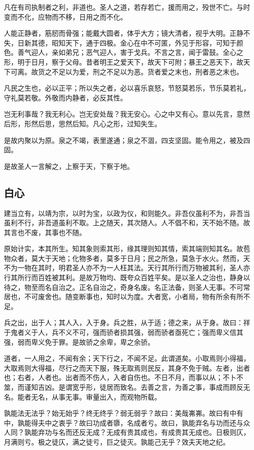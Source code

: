 凡在有司执制者之利，非道也。圣人之道，若存若亡，援而用之，殁世不亡。与时变而不化，应物而不移，日用之而不化。

人能正静者，筋肕而骨强；能戴大圆者，体乎大方；镜大清者，视乎大明。正静不失，日新其德，昭知天下，通于四极。金心在中不可匿，外见于形容，可知于颜色。善气迎人，亲如弟兄；恶气迎人，害于戈兵。不言之言，闻于雷鼓。全心之形，明于日月，察于父母。昔者明王之爱天下，故天下可附；暴王之恶天下，故天下可离。故货之不足以为爱，刑之不足以为恶。货者爱之末也，刑者恶之末也。

凡民之生也，必以正平；所以失之者，必以喜乐哀怒，节怒莫若乐，节乐莫若礼，守礼莫若敬。外敬而内静者，必反其性。

岂无利事哉？我无利心。岂无安处哉？我无安心。心之中又有心。意以先言，意然后形，形然后思，思然后知。凡心之形，过知失生。

是故内聚以为原。泉之不竭，表里遂通；泉之不涸，四支坚固。能令用之，被及四固。

是故圣人一言解之，上察于天，下察于地。

\subsection{白心}

建当立有，以靖为宗，以时为宝，以政为仪，和则能久。非吾仪虽利不为，非吾当虽利不行，非吾道虽利不取。上之随天，其次随人。人不倡不和，天不始不随。故其言也不废，其事也不随。

原始计实，本其所生。知其象则索其形，缘其理则知其情，索其端则知其名。故苞物众者，莫大于天地；化物多者，莫多于日月；民之所急，莫急于水火。然而，天不为一物在其时，明君圣人亦不为一人枉其法。天行其所行而万物被其利，圣人亦行其所行而百姓被其利。是故万物均、既夸众百姓平矣。是以圣人之治也，静身以待之，物至而名自治之。正名自治之，奇身名废。名正法备，则圣人无事。不可常居也，不可废舍也。随变断事也，知时以为度。大者宽，小者局，物有所余有所不足。

兵之出，出于人；其人入，入于身。兵之胜，从于适；德之来，从于身。故曰：祥于鬼者义于人，兵不义不可，强而骄者损其强，弱而骄者亟死亡；强而卑义信其强，弱而卑义免于罪。是故骄之余卑，卑之余骄。

道者，一人用之，不闻有余；天下行之，不闻不足。此谓道矣。小取焉则小得福，大取焉则大得福，尽行之而天下服，殊无取焉则民反，其身不免于贼。左者，出者也；右者，人者也。出者而不伤人，入者自伤也。不日不月，而事以从；不卜不筮，而谨知吉凶。是谓宽乎形，徒居而致名。去善之言，为善之事，事成而顾反无名。能者无名，从事无事。审量出入，而观物所载。

孰能法无法乎？始无始乎？终无终乎？弱无弱乎？故曰：美哉岪岪。故曰有中有中，孰能得夫中之衷乎？故曰功成者隳，名成者亏。故曰，孰能弃名与功而还与众人同？孰能弃功与名而还反无成？无成有贵其成也，有成贵其无成也。日极则仄，月满则亏。极之徒仄，满之徒亏，巨之徒灭。孰能己无乎？效夫天地之纪。

